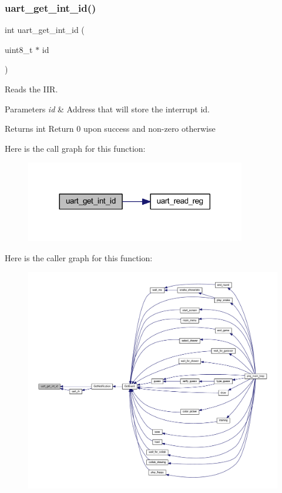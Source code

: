 \subsubsection{\texorpdfstring{uart\+\_\+get\+\_\+int\+\_\+id()}{uart\_get\_int\_id()}}
{\footnotesize\ttfamily int uart\+\_\+get\+\_\+int\+\_\+id (\begin{DoxyParamCaption}\item[{uint8\+\_\+t $\ast$}]{id }\end{DoxyParamCaption})}



Reads the I\+IR. 


\begin{DoxyParams}{Parameters}
{\em id} & Address that will store the interrupt id. \\
\hline
\end{DoxyParams}
\begin{DoxyReturn}{Returns}
int Return 0 upon success and non-\/zero otherwise 
\end{DoxyReturn}
Here is the call graph for this function\+:\nopagebreak
\begin{figure}[H]
\begin{center}
\leavevmode
\includegraphics[width=272pt]{group__uart_ga488f8e4b1795dcbe268f9629176c0740_cgraph}
\end{center}
\end{figure}
Here is the caller graph for this function\+:\nopagebreak
\begin{figure}[H]
\begin{center}
\leavevmode
\includegraphics[width=350pt]{group__uart_ga488f8e4b1795dcbe268f9629176c0740_icgraph}
\end{center}
\end{figure}
\mbox{\label{group__uart_ga67d2da4dd20c731989c130bbe2cd4c85}} 
